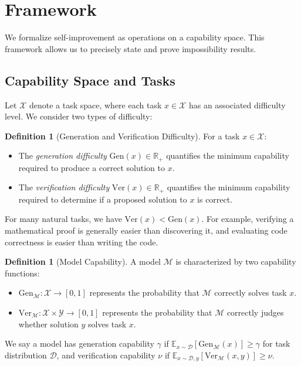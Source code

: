 \documentclass{article}
\theoremstyle{definition}
\newtheorem{definition}[theorem]{Definition}
\theoremstyle{remark}
\newcommand{\M}{\mathcal{M}}  %
\newcommand{\D}{\mathcal{D}}  %
\newcommand{\Gen}{\text{Gen}}  %
\newcommand{\Ver}{\text{Ver}}  %
\newcommand{\E}{\mathbb{E}}    %
\newcommand{\R}{\mathbb{R}}    %
\begin{document}
\section{Framework}
\label{sec:framework}

We formalize self-improvement as operations on a capability space. This framework allows us to precisely state and prove impossibility results.

\subsection{Capability Space and Tasks}

Let \(\mathcal{X}\) denote a task space, where each task \(x \in \mathcal{X}\) has an associated difficulty level. We consider two types of difficulty:

\begin{definition}[Generation and Verification Difficulty]
\label{def:difficulties}
For a task \(x \in \mathcal{X}\):
\begin{itemize}
\item The \emph{generation difficulty} \(\Gen(x) \in \R_+\) quantifies the minimum capability required to produce a correct solution to \(x\).
\item The \emph{verification difficulty} \(\Ver(x) \in \R_+\) quantifies the minimum capability required to determine if a proposed solution to \(x\) is correct.
\end{itemize}
\end{definition}

For many natural tasks, we have \(\Ver(x) < \Gen(x)\). For example, verifying a mathematical proof is generally easier than discovering it, and evaluating code correctness is easier than writing the code.

\begin{definition}[Model Capability]
\label{def:capability}
A model \(\M\) is characterized by two capability functions:
\begin{itemize}
\item \(\Gen_\M : \mathcal{X} \to [0,1]\) represents the probability that \(\M\) correctly solves task \(x\).
\item \(\Ver_\M : \mathcal{X} \times \mathcal{Y} \to [0,1]\) represents the probability that \(\M\) correctly judges whether solution \(y\) solves task \(x\).
\end{itemize}
\end{definition}

We say a model has generation capability \(\gamma\) if \(\E_{x \sim \D}[\Gen_\M(x)] \geq \gamma\) for task distribution \(\D\), and verification capability \(\nu\) if \(\E_{x \sim \D, y}[\Ver_\M(x,y)] \geq \nu\).
\end{document}

